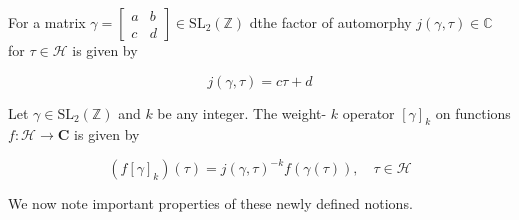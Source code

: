 \begin{definition}
    For a matrix $\gamma=\left[\begin{array}{ll}a & b \\ c & d\end{array}\right] \in \mathrm{SL}_{2}(\mathbb{Z})$ dthe factor of automorphy $j(\gamma, \tau) \in \mathbb{C}$ for $\tau \in \mathcal{H}$ is given by 

$$
j(\gamma, \tau)=c \tau+d
$$
\end{definition}
\begin{definition}
     Let $\gamma \in \mathrm{SL}_{2}(\mathbb{Z})$ and $k$ be any integer. The weight- $k$ operator $[\gamma]_{k}$ on functions $f: \mathcal{H} \longrightarrow \mathbf{C}$ is given by

$$
\left(f[\gamma]_{k}\right)(\tau)=j(\gamma, \tau)^{-k} f(\gamma(\tau)), \quad \tau \in \mathcal{H}
$$
\end{definition} 
We now note important properties of these newly defined notions. 
